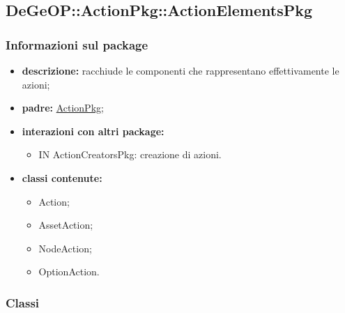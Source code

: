 \subsection{DeGeOP::ActionPkg::ActionElementsPkg}
\label{pkg::ActionElementsPkg}
\subsubsection{Informazioni sul package}
\begin{itemize}
	\item \textbf{descrizione:} racchiude le componenti che rappresentano effettivamente le azioni;
	\item \textbf{padre:} \hyperref[pkg::ActionPkg]{ActionPkg};
	\item \textbf{interazioni con altri package:} 
	\begin{itemize}
		\item IN ActionCreatorsPkg: creazione di azioni.
	\end{itemize}
	\item \textbf{classi contenute:}
	\begin{itemize}
		\item Action;
		\item AssetAction;
		\item NodeAction;
		\item OptionAction.
	\end{itemize}
\end{itemize}
\subsubsection{Classi}
